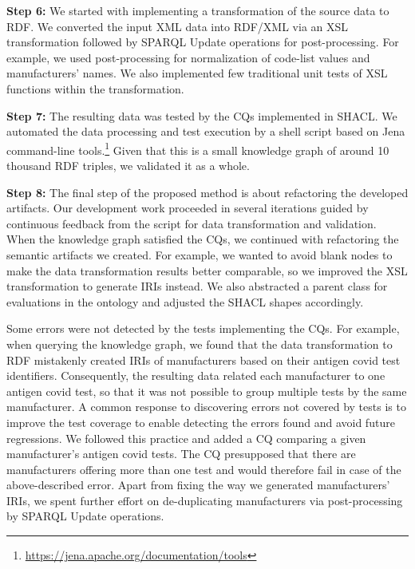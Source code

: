 \documentclass[
]{ceurart}
\begin{document}
\textbf{Step 6:} We started with implementing a transformation of the source data to RDF. We converted the input XML data into RDF/XML via an XSL transformation followed by SPARQL Update operations for post-processing. For example, we used post-processing for normalization of code-list values and manufacturers' names. We also implemented few traditional unit tests of XSL functions within the transformation.

\textbf{Step 7:} The resulting data was tested by the CQs implemented in SHACL. We automated the data processing and test execution by a shell script based on Jena command-line tools.\footnote{\url{https://jena.apache.org/documentation/tools}} Given that this is a small knowledge graph of around 10 thousand RDF triples, we validated it as a whole.

\textbf{Step 8:} The final step of the proposed method is about refactoring the developed artifacts. Our development work proceeded in several iterations guided by continuous feedback from the script for data transformation and validation. When the knowledge graph satisfied the CQs, we continued with refactoring the semantic artifacts we created. For example, we wanted to avoid blank nodes to make the data transformation results better comparable, so we improved the XSL transformation to generate IRIs instead. We also abstracted a parent class for evaluations in the ontology and adjusted the SHACL shapes accordingly.

Some errors were not detected by the tests implementing the CQs. For example, when querying the knowledge graph, we found that the data transformation to RDF mistakenly created IRIs of manufacturers based on their antigen covid test identifiers. Consequently, the resulting data related each manufacturer to one antigen covid test, so that it was not possible to group multiple tests by the same manufacturer. A common response to discovering errors not covered by tests is to improve the test coverage to enable detecting the errors found and avoid future regressions. We followed this practice and added a CQ comparing a given manufacturer's antigen covid tests. The CQ presupposed that there are manufacturers offering more than one test and would therefore fail in case of the above-described error. Apart from fixing the way we generated manufacturers' IRIs, we spent further effort on de-duplicating manufacturers via post-processing by SPARQL Update operations.
\end{document}

